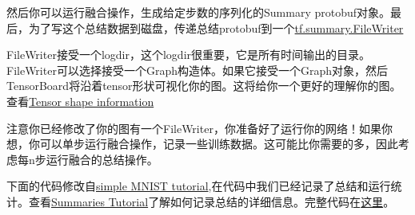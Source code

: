  然后你可以运行融合操作，生成给定步数的序列化的Summary protobuf对象。最后，为了写这个总结数据到磁盘，传递总结protobuf到一个\href{https://www.tensorflow.org/api_docs/python/tf/summary/FileWriter}{tf.summary.FileWriter}
 
 FileWriter接受一个logdir，这个logdir很重要，它是所有时间输出的目录。FileWriter可以选择接受一个Graph构造体。如果它接受一个Graph对象，然后TensorBoard将沿着tensor形状可视化你的图。这将给你一个更好的理解你的图。查看\href{https://www.tensorflow.org/programmers_guide/graph_viz#tensor-shape-information}{Tensor shape information}
 
 注意你已经修改了你的图有一个FileWriter，你准备好了运行你的网络！如果你想，你可以单步运行融合操作，记录一些训练数据。这可能比你需要的多，因此考虑每n步运行融合的总结操作。
 
 下面的代码修改自\href{https://www.tensorflow.org/tutorials/layers}{simple MNIST tutorial},在代码中我们已经记录了总结和运行统计。查看\href{https://www.tensorflow.org/programmers_guide/summaries_and_tensorboard#serializing-the-data}{Summaries Tutorial}了解如何记录总结的详细信息。完整代码在\href{https://www.github.com/tensorflow/tensorflow/blob/r1.6/tensorflow/examples/tutorials/mnist/mnist_with_summaries.py}{这里}。
